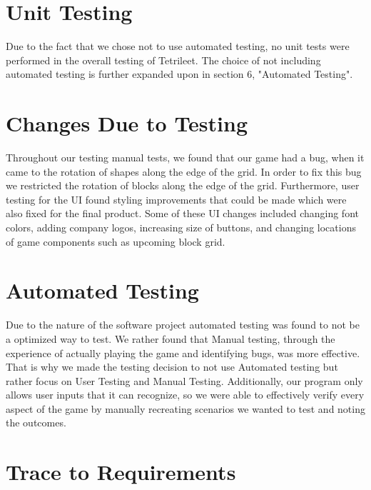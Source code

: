 \documentclass[12pt, titlepage]{article}
\begin{document}
\section{Unit Testing}

Due to the fact that we chose not to use automated testing, no unit tests were performed in the overall testing of Tetrileet. The choice of not including automated testing is further expanded upon in section 6, "Automated Testing".

\section{Changes Due to Testing}
Throughout our testing manual tests, we found that our game had a bug, when it came to the rotation of shapes along the edge of the grid. In order to fix this bug we restricted the rotation of blocks along the edge of the grid. Furthermore, user testing for the UI found styling improvements that could be made which were also fixed for the final product. Some of these UI changes included changing font colors, adding company logos, increasing size of buttons, and changing locations of game components such as upcoming block grid.  
\section{Automated Testing}
Due to the nature of the software project automated testing was found to not be a optimized way to test. We rather found that Manual testing, through the experience of actually playing the game and identifying bugs, was more effective. That is why we made the testing decision to not use Automated testing but rather focus on User Testing and Manual Testing. Additionally, our program only allows user inputs that it can recognize, so we were able to effectively verify every aspect of the game by manually recreating scenarios we wanted to test and noting the outcomes.


\section{Trace to Requirements}
		
\end{document}
